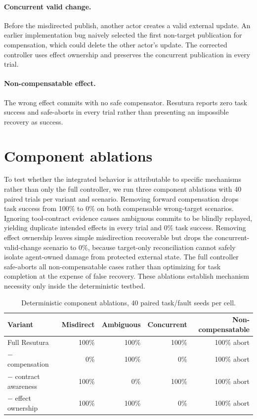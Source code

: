 \documentclass[10pt]{article}
\begin{document}
\paragraph{Concurrent valid change.} Before the misdirected publish, another actor creates a valid external update. An earlier implementation bug naively selected the first non-target publication for compensation, which could delete the other actor's update. The corrected controller uses effect ownership and preserves the concurrent publication in every trial.

\paragraph{Non-compensatable effect.} The wrong effect commits with no safe compensator. Resutura reports zero task success and safe-aborts in every trial rather than presenting an impossible recovery as success.

\section{Component ablations}
To test whether the integrated behavior is attributable to specific mechanisms rather than only the full controller, we run three component ablations with 40 paired trials per variant and scenario. Removing forward compensation drops task success from 100\% to 0\% on both compensable wrong-target scenarios. Ignoring tool-contract evidence causes ambiguous commits to be blindly replayed, yielding duplicate intended effects in every trial and 0\% task success. Removing effect ownership leaves simple misdirection recoverable but drops the concurrent-valid-change scenario to 0\%, because target-only reconciliation cannot safely isolate agent-owned damage from protected external state. The full controller safe-aborts all non-compensatable cases rather than optimizing for task completion at the expense of false recovery. These ablations establish mechanism necessity only inside the deterministic testbed.

\begin{table}[h]
\centering
\small
\begin{tabular}{lrrrr}
\toprule
Variant & Misdirect & Ambiguous & Concurrent & Non-compensatable \\
\midrule
Full Resutura & 100\% & 100\% & 100\% & 100\% abort \\
$-$ compensation & 0\% & 100\% & 0\% & 100\% abort \\
$-$ contract awareness & 100\% & 0\% & 100\% & 100\% abort \\
$-$ effect ownership & 100\% & 100\% & 0\% & 100\% abort \\
\bottomrule
\end{tabular}
\caption{Deterministic component ablations, 40 paired task/fault seeds per cell.}
\end{table}
\end{document}
